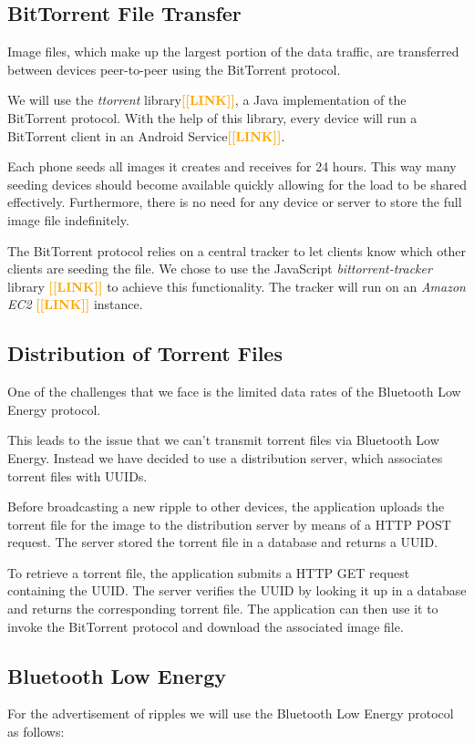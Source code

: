 \documentclass{report}
\newcommand{\todo}[1]{\textsf{\textbf{\textcolor{orange}{[[#1]]}}}}
\begin{document}
\subsection{BitTorrent File Transfer}
Image files, which make up the largest portion of the data traffic, are transferred between devices peer-to-peer using the BitTorrent protocol.

We will use the \textit{ttorrent} library\todo{LINK}, a Java implementation of the BitTorrent protocol. With the help of this library, every device will run a BitTorrent client in an Android Service\todo{LINK}.

Each phone seeds all images it creates and receives for 24 hours. This way many seeding devices should become available quickly allowing for the load to be shared effectively. Furthermore, there is no need for any device or server to store the full image file indefinitely.

The BitTorrent protocol relies on a central tracker to let clients know which other clients are seeding the file. We chose to use the JavaScript \textit{bittorrent-tracker} library \todo{LINK} to achieve this functionality. The tracker will run on an \textit{Amazon EC2} \todo{LINK} instance.

\subsection{Distribution of Torrent Files}
One of the challenges that we face is the limited data rates of the Bluetooth Low Energy protocol.

This leads to the issue that we can't transmit torrent files via Bluetooth Low Energy. Instead we have decided to use a distribution server, which associates torrent files with UUIDs.

Before broadcasting a new ripple to other devices, the application uploads the torrent file for the image to the distribution server by means of a HTTP POST request. The server stored the torrent file in a database and returns a UUID. 

To retrieve a torrent file, the application submits a HTTP GET request containing the UUID. The server verifies the UUID by looking it up in a database and returns the corresponding torrent file. The application can then use it to invoke the BitTorrent protocol and download the associated image file.

\subsection{Bluetooth Low Energy}
For the advertisement of ripples we will use the Bluetooth Low Energy protocol as follows:
\end{document}
